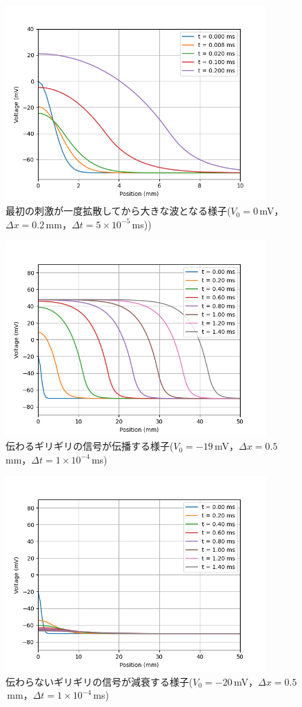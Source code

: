 \documentclass[a4paper,11pt]{jsarticle}
\begin{document}
\begin{figure}[htbp]
  \centering
  \includegraphics[width=10cm]{attewave.png}
  \caption{最初の刺激が一度拡散してから大きな波となる様子($V_0=0$\,mV，$\Delta x=0.2$\,mm，$\Delta t = 5\times 10^{-5}$\,ms))}
  \label{fig:attewave}
\end{figure}

\begin{figure}[htbp]
  \centering
  \includegraphics[width=10cm]{limit_-19mV.png}
  \caption{伝わるギリギリの信号が伝播する様子($V_0=-19$\,mV，$\Delta x=0.5$\,mm，$\Delta t = 1\times 10^{-4}$\,ms)}
  \label{fig:lim1}
\end{figure}

\begin{figure}[htbp]
  \centering
  \includegraphics[width=10cm]{limit_-20mV.png}
  \caption{伝わらないギリギリの信号が減衰する様子($V_0=-20$\,mV，$\Delta x=0.5$\,mm，$\Delta t = 1\times 10^{-4}$\,ms)}
  \label{fig:lim2}
\end{figure}
\end{document}

